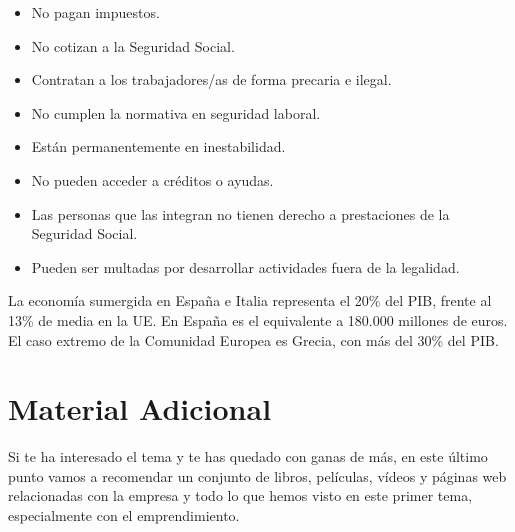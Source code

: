 \begin{itemize}
    \item No pagan impuestos.
    \item No cotizan a la Seguridad Social.
    \item Contratan a los trabajadores/as de forma precaria e ilegal.
    \item No cumplen la normativa en seguridad laboral.
    \item Están permanentemente en inestabilidad.
    \item No pueden acceder a créditos o ayudas.
    \item Las personas que las integran no tienen derecho a prestaciones de la Seguridad Social.
    \item Pueden ser multadas por desarrollar actividades fuera de la legalidad.
\end{itemize}

La economía sumergida en España e Italia representa el 20\% del PIB, frente al 13\% de media en la UE. En España es el equivalente a 180.000 millones de euros. El caso extremo de la Comunidad Europea es Grecia, con más del 30\% del PIB.

\section{Material Adicional}
Si te ha interesado el tema y te has quedado con ganas de más, en este último punto vamos a recomendar un conjunto de libros, películas, vídeos y páginas web relacionadas con la empresa y todo lo que hemos visto en este primer tema, especialmente con el emprendimiento.

